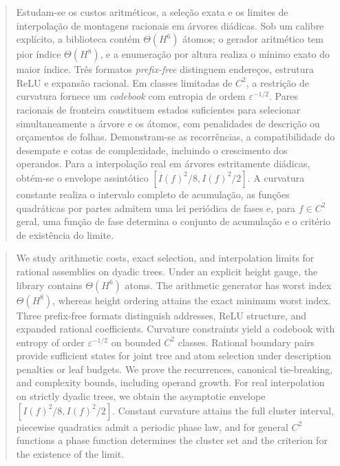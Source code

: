 

\renewcommand{\abstractname}{Resumo}
\begin{abstract}Estudam-se os custos aritméticos, a seleção exata e os limites de interpolação de montagens racionais em árvores diádicas. Sob um calibre explícito, a biblioteca contém $\Theta(H^6)$ átomos; o gerador aritmético tem pior índice $\Theta(H^8)$, e a enumeração por altura realiza o mínimo exato do maior índice. Três formatos \emph{prefix-free} distinguem endereços, estrutura ReLU e expansão racional. Em classes limitadas de $C^2$, a restrição de curvatura fornece um \emph{codebook} com entropia de ordem $\varepsilon^{-1/2}$. Pares racionais de fronteira constituem estados suficientes para selecionar simultaneamente a árvore e os átomos, com penalidades de descrição ou orçamentos de folhas. Demonstram-se as recorrências, a compatibilidade do desempate e cotas de complexidade, incluindo o crescimento dos operandos. Para a interpolação real em árvores estritamente diádicas, obtém-se o envelope assintótico $[I(f)^2/8,\allowbreak I(f)^2/2]$. A curvatura constante realiza o intervalo completo de acumulação, as funções quadráticas por partes admitem uma lei periódica de fases e, para $f\in C^2$ geral, uma função de fase determina o conjunto de acumulação e o critério de existência do limite.\end{abstract}
\renewcommand{\abstractname}{Abstract}
\begin{abstract}We study arithmetic costs, exact selection, and interpolation limits for rational assemblies on dyadic trees. Under an explicit height gauge, the library contains $\Theta(H^6)$ atoms. The arithmetic generator has worst index $\Theta(H^8)$, whereas height ordering attains the exact minimum worst index. Three prefix-free formats distinguish addresses, ReLU structure, and expanded rational coefficients. Curvature constraints yield a codebook with entropy of order $\varepsilon^{-1/2}$ on bounded $C^2$ classes. Rational boundary pairs provide sufficient states for joint tree and atom selection under description penalties or leaf budgets. We prove the recurrences, canonical tie-breaking, and complexity bounds, including operand growth. For real interpolation on strictly dyadic trees, we obtain the asymptotic envelope $[I(f)^2/8,\allowbreak I(f)^2/2]$. Constant curvature attains the full cluster interval, piecewise quadratics admit a periodic phase law, and for general $C^2$ functions a phase function determines the cluster set and the criterion for the existence of the limit.\end{abstract}
\renewcommand{\abstractname}{Resumo}
